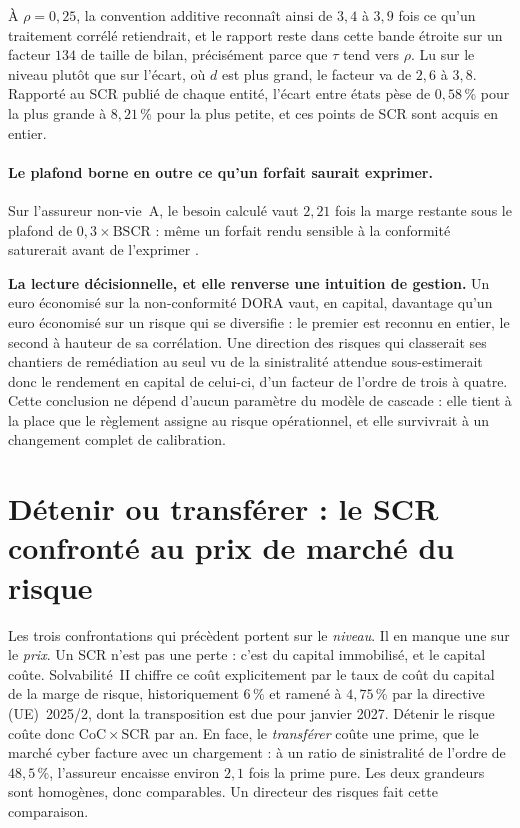 \vspace{2pt}
\noindent À $\rho = 0{,}25$, la convention additive reconnaît ainsi de $3{,}4$ à $3{,}9$ fois ce
qu'un traitement corrélé retiendrait, et le rapport reste dans cette bande étroite sur un facteur
$134$ de taille de bilan, précisément parce que $\tau$ tend vers $\rho$. Lu sur le niveau plutôt
que sur l'écart, où $d$ est plus grand, le facteur va de $2{,}6$ à $3{,}8$. Rapporté au
SCR publié de chaque entité, l'écart entre états pèse de $0{,}58\,\%$ pour la plus grande
à $8{,}21\,\%$ pour la plus petite, et ces points de SCR sont acquis en entier.

\paragraph{Le plafond borne en outre ce qu'un forfait saurait exprimer.} Sur l'assureur non-vie~A,
le besoin calculé vaut $2{,}21$ fois la marge restante sous le plafond de $0{,}3 \times
\mathrm{BSCR}$ : même un forfait rendu sensible à la conformité saturerait avant de l'exprimer
\matcomp.

\begin{cle}
\textbf{La lecture décisionnelle, et elle renverse une intuition de gestion.} Un euro économisé
sur la non-conformité DORA vaut, en capital, davantage qu'un euro économisé sur un risque
qui se diversifie : le premier est reconnu en entier, le second à hauteur de sa corrélation. Une
direction des risques qui classerait ses chantiers de remédiation au seul vu de la sinistralité
attendue sous-estimerait donc le rendement en capital de celui-ci, d'un facteur de l'ordre de
trois à quatre. Cette conclusion ne dépend d'aucun paramètre du modèle de cascade : elle tient à
la place que le règlement assigne au risque opérationnel, et elle survivrait à un changement
complet de calibration.
\end{cle}


\section{Détenir ou transférer : le SCR confronté au prix de marché du risque}
\label{sec:detenir-transferer}

Les trois confrontations qui précèdent portent sur le \emph{niveau}. Il en manque une sur le
\emph{prix}. Un SCR n'est pas une perte : c'est du capital immobilisé, et le capital coûte.
Solvabilité~II chiffre ce coût explicitement par le taux de coût du capital de la marge de
risque, historiquement $6\,\%$ et ramené à $4{,}75\,\%$ par la directive
(UE)~2025/2, dont la transposition est due pour janvier 2027. Détenir le risque coûte donc
$\mathrm{CoC}\times\mathrm{SCR}$ par an. En face, le \emph{transférer} coûte une prime, que le
marché cyber facture avec un chargement : à un ratio de sinistralité de l'ordre de
$48{,}5\,\%$, l'assureur encaisse environ $2{,}1$ fois la prime pure. Les deux grandeurs sont
homogènes, donc comparables. Un directeur des risques fait cette comparaison.

